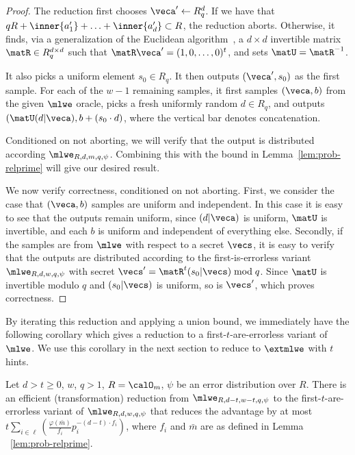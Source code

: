 \begin{proof}
  The reduction first chooses $\veca'\gets R_q^d$. 
If we have that $qR+\inner{a'_1}+\ldots+\inner{a'_d} \subset R$, the reduction
aborts. Otherwise, it finds, via a generalization of the
  Euclidean algorithm~\cite{extendeuclidideals}, a $d \times d$
  invertible matrix  $\matR \in R_q^{d \times d}$ such that
  $\matR\veca'=(1,0,\ldots,0)^t$, and sets $\matU = \matR^{-1}$.  

It also picks a uniform element $s_0 \in
R_q$. It then outputs $(\veca', s_0)$  as the first sample. For
each of the $w-1$ remaining samples, it first samples $(\veca,b)$ from
the given $\mlwe$ oracle, picks a fresh uniformly random $d \in
R_q$, and outputs $(\matU(d|\veca), b+ (s_0\cdot d)$, where the
vertical bar denotes concatenation. 

Conditioned on not aborting, we will verify that the
output is distributed according $\mlwe_{R,d,m,q,\psi}$. Combining this
with the bound in Lemma~\ref{lem:prob-relprime} will give our desired result.

We now verify correctness, conditioned on not aborting. First, we consider the
case that
$(\veca,b)$ samples are uniform and independent. In this case it is
easy to see that the outputs remain uniform, since $(d|\veca)$ is
uniform, $\matU$ is invertible, and each $b$ is uniform and independent of
everything else. Secondly, if the samples are from $\mlwe$ with
respect to a secret $\vecs$, it is easy to verify that the outputs are
distributed according to the first-is-errorless variant
$\mlwe_{R,d,w,q,\psi}$ with secret $\vecs'=\matR^{t}(s_0|\vecs)
\bmod{q}$. Since $\matU$ is invertible modulo $q$ and $(s_0|\vecs)$ is
uniform, so is $\vecs'$, which proves correctness.
\end{proof}

By iterating this reduction and applying a union bound, we immediately have the following
corollary which gives a reduction to a first-$t$-are-errorless variant
of $\mlwe$. We use this corollary in the next section to reduce to
$\extmlwe$ with $t$ hints.
\begin{corollary}\label{lem:first-t-errorless}
  Let $d > t \geq 0$, $w$, $q > 1$,  $R=\calO_{m}$, $\psi$ be an error
  distribution over $R$. There is an efficient (transformation) reduction from
  $\mlwe_{R,d-t,w-t,q,\psi}$ to the first-$t$-are-errorless variant of
  $\mlwe_{R,d,w,q,\psi}$ that reduces the advantage by at most
  $t \sum_{i \in
  \ell}\left(\frac{\varphi(\bar{m})}{f_i}p_i^{-(d-t)\cdot f_i} \right)$, where
  $f_i$ and $\bar{m}$ are as defined in Lemma ~\ref{lem:prob-relprime}.
\end{corollary}

